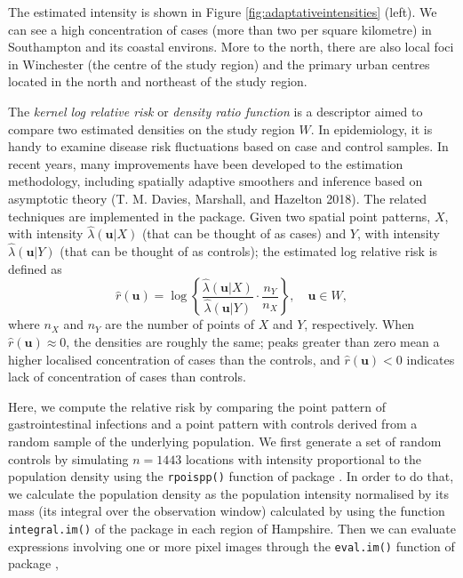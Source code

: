 The estimated intensity is shown in Figure \ref{fig:adaptativeintensities} (left). We can see a high concentration of cases (more than two per square kilometre) in Southampton and its coastal environs. More to the north, there are also local foci in Winchester (the centre of the study region) and the primary urban centres located in the north and northeast of the study region.

The \emph{kernel log relative risk} or \emph{density ratio function} is a descriptor aimed to compare two estimated densities on the study region \(W\). In epidemiology, it is handy to examine disease risk fluctuations based on case and control samples. In recent years, many improvements have been developed to the estimation methodology, including spatially adaptive smoothers and inference based on asymptotic theory (T. M. Davies, Marshall, and Hazelton 2018). The related techniques are implemented in the  package. Given two spatial point patterns, \(X\), with intensity \(\hat{\lambda}(\mathbf{u}|X)\) (that can be thought of as cases) and \(Y\), with intensity \(\hat{\lambda}(\mathbf{u}|Y)\) (that can be thought of as controls); the estimated log relative risk is defined as
\begin{equation}
    \hat{r}(\mathbf{u})=\log \left\{\frac{\hat{\lambda}(\mathbf{u}|X)}{\hat{\lambda}(\mathbf{u}|Y) } \cdot \frac{n_Y}{n_X} \right\}, \quad \mathbf{u} \in W,
    \label{eq:relrisk}
\end{equation}
where \(n_X\) and \(n_Y\) are the number of points of \(X\) and \(Y\), respectively. When \(\hat{r}(\mathbf{u}) \approx 0\), the densities are roughly the same; peaks greater than zero mean a higher localised concentration of cases than the controls, and \(\hat{r}(\mathbf{u}) < 0\) indicates lack of concentration of cases than controls.

Here, we compute the relative risk by comparing the point pattern of gastrointestinal infections and a point pattern with controls derived from a random sample of the underlying population. We first generate a set of random controls by simulating \(n=1443\) locations with intensity proportional to the population density using the \texttt{rpoispp()} function of package . In order to do that, we calculate the population density as the population intensity normalised by its mass (its integral over the observation window) calculated by using the function \texttt{integral.im()} of the package  in each region of Hampshire. Then we can evaluate expressions involving one or more pixel images through the \texttt{eval.im()} function of package ,


